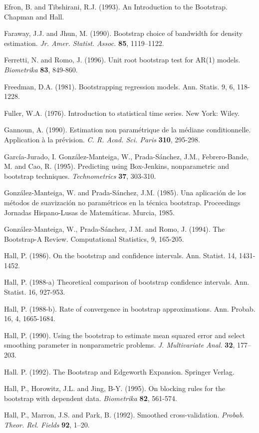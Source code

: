 \documentclass[]{book}
\theoremstyle{definition}
\theoremstyle{definition}
\theoremstyle{definition}
\theoremstyle{remark}
\begin{document}
Efron, B. and Tibshirani, R.J. (1993). An Introduction to the Bootstrap.
Chapman and Hall.

Faraway, J.J. and Jhun, M. (1990). Bootstrap choice of bandwidth for
density estimation. \emph{Jr. Amer. Statist. Assoc.} \textbf{85},
1119--1122.

Ferretti, N. and Romo, J. (1996). Unit root bootstrap test for AR(1)
models. \emph{Biometrika} \textbf{83}, 849-860.

Freedman, D.A. (1981). Bootstrapping regression models. Ann. Statis. 9,
6, 118-1228.

Fuller, W.A. (1976). Introduction to statistical time series. New York:
Wiley.

Gannoun, A. (1990). Estimation non paramétrique de la médiane
conditionnelle. Application à la prévision. \emph{C. R. Acad. Sci.
Paris} \textbf{310}, 295-298.

García-Jurado, I. González-Manteiga, W., Prada-Sánchez, J.M.,
Febrero-Bande, M. and Cao, R. (1995). Predicting using Box-Jenkins,
nonparametric and bootstrap techniques. \emph{Technometrics}
\textbf{37}, 303-310.

González-Manteiga, W. and Prada-Sánchez, J.M. (1985). Una aplicación de
los métodos de suavización no paramétricos en la técnica bootstrap.
Proceedings Jornadas Hispano-Lusas de Matemáticas. Murcia, 1985.

González-Manteiga, W., Prada-Sánchez, J.M. and Romo, J. (1994). The
Bootstrap-A Review. Computational Statistics, 9, 165-205.

Hall, P. (1986). On the bootstrap and confidence intervals. Ann.
Statist. 14, 1431-1452.

Hall, P. (1988-a) Theoretical comparison of bootstrap confidence
intervals. Ann. Statist. 16, 927-953.

Hall, P. (1988-b). Rate of convergence in bootstrap approximations. Ann.
Probab. 16, 4, 1665-1684.

Hall, P. (1990). Using the bootstrap to estimate mean squared error and
select smoothing parameter in nonparametric problems. \emph{J.
Multivariate Anal.} \textbf{32}, 177--203.

Hall. P. (1992). The Bootstrap and Edgeworth Expansion. Springer Verlag.

Hall, P., Horowitz, J.L. and Jing, B-Y. (1995). On blocking rules for
the bootstrap with dependent data. \emph{Biometrika} \textbf{82},
561-574.

Hall, P., Marron, J.S. and Park, B. (1992). Smoothed cross-validation.
\emph{Probab. Theor. Rel. Fields} \textbf{92}, 1--20.
\end{document}

